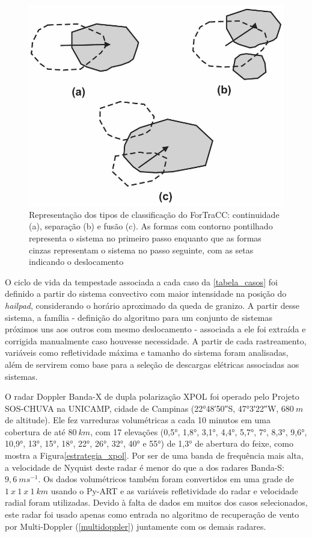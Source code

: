\begin{figure}[htb]
	\begin{center}
		\caption{Representação dos tipos de classificação do ForTraCC: continuidade (a), separação (b) e fusão (c). As formas com contorno pontilhado representa o sistema no primeiro passo enquanto que as formas cinzas representam o sistema no passo seguinte, com as setas indicando o deslocamento} 
		\label{fortracc_teoria}
		\includegraphics[width=0.5\columnwidth]{figs/fortracc_classes.png}
	\end{center}
\end{figure}

O ciclo de vida da tempestade associada a cada caso da \autoref{tabela_casos} foi definido a partir do sistema convectivo com maior intensidade na posição do \textit{hailpad}, considerando o horário aproximado da queda de granizo. A partir desse sistema, a família - definição do algoritmo para um conjunto de sistemas próximos uns aos outros com mesmo deslocamento - associada a ele foi extraída e corrigida manualmente caso houvesse necessidade. A partir de cada rastreamento, variáveis como refletividade máxima e tamanho do sistema foram analisadas, além de servirem como base para a seleção de descargas elétricas associadas aos sistemas.

O radar Doppler Banda-X de dupla polarização XPOL foi operado pelo Projeto SOS-CHUVA na UNICAMP, cidade de Campinas (\ang{22;48;50}\:S, \ang{47;3;22}\:W, $680\:m$ de altitude). Ele fez varreduras volumétricas a cada 10 minutos em uma cobertura de até $80\:km$, com 17 elevações (\ang{0,5}, \ang{1,8}, \ang{3,1}, \ang{4,4}, \ang{5,7}, \ang{7}, \ang{8,3}, \ang{9,6}, \ang{10,9}, \ang{13}, \ang{15}, \ang{18}, \ang{22}, \ang{26}, \ang{32}, \ang{40} e \ang{55}) de \ang{1,3} de abertura do feixe, como mostra a Figura\autoref{estrategia_xpol}. Por ser de uma banda de frequência mais alta, a velocidade de Nyquist deste radar é menor do que a dos radares Banda-S: $9,6\:ms^{-1}$. Os dados volumétricos também foram convertidos em uma grade de $1\:x\:1\:x\:1\:km$ usando o Py-ART \cite{Helmus2016} e as variáveis refletividade do radar e velocidade radial foram utilizadas. Devido à falta de dados em muitos dos casos selecionados, este radar foi usado apenas como entrada no algoritmo de recuperação de vento por Multi-Doppler (\autoref{multidoppler}) juntamente com os demais radares.

